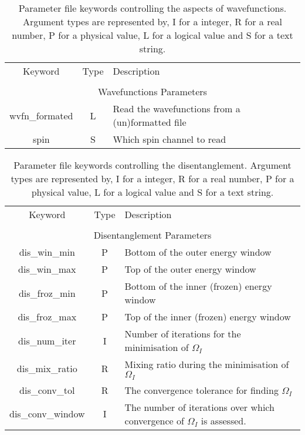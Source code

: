 \begin{table}
\begin{center}
\begin{tabular}{|c|c|p{6cm}|}
\hline
Keyword & Type & Description \\
        &      &             \\
\hline\hline
\multicolumn{3}{|c|}{Wavefunctions Parameters} \\
\hline
{\sc wvfn\_formated }   & L & Read the wavefunctions from a  (un)formatted file  \\
{\sc spin }   & S & Which spin channel to read \\
\hline
\end{tabular}
\caption
{Parameter file keywords controlling the aspects of wavefunctions.  Argument types
are represented by, I for a integer, R for a real number, P for a
physical value, L for a logical value and S for a text string.}
\label{parameter_keywords2}
\end{center}
\end{table}



\begin{table}
\begin{center}
\begin{tabular}{|c|c|p{6cm}|}
\hline
Keyword & Type & Description \\
        &      &             \\
\hline\hline
\multicolumn{3}{|c|}{Disentanglement Parameters} \\
\hline
{\sc dis\_win\_min }   & P & Bottom of the outer energy window \\
{\sc dis\_win\_max }   & P & Top of the outer energy window \\
{\sc dis\_froz\_min }   & P & Bottom of the inner (frozen) energy window \\
{\sc dis\_froz\_max }   & P & Top of the inner (frozen) energy window \\
{\sc dis\_num\_iter }   & I & Number of iterations for the minimisation
of $\Omega_{I}$ \\
{\sc dis\_mix\_ratio }   & R & Mixing ratio during the minimisation of $\Omega_{I}$\\
{\sc dis\_conv\_tol }   & R & The convergence tolerance for finding $\Omega_{I}$ \\
{\sc dis\_conv\_window }   & I & The number of iterations over which
convergence of $\Omega_{I}$ is assessed. \\ 
\hline
\end{tabular}
\caption[Parameter file keywords controlling disentanglement parameters.]
{Parameter file keywords controlling the disentanglement.  Argument types
are represented by, I for a integer, R for a real number, P for a
physical value, L for a logical value and S for a text string.}
\label{parameter_keywords4}
\end{center}
\end{table}



